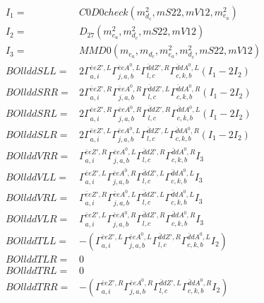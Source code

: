 \documentclass[A4,landscape]{article}
\begin{document}
\begin{align} 
I_1 = & C0D0check(m^2_{d_{{c}}}, mS22, mV12, m^2_{e_{{a}}}) \\ 
I_2 = & D_{27}(m^2_{e_{{a}}}, m^2_{d_{{c}}}, mS22, mV12) \\ 
I_3 = & MMD0(m_{e_{{a}}}, m_{d_{{c}}}, m^2_{e_{{a}}}, m^2_{d_{{c}}}, mS22, mV12) \\ 
  BOllddSLL= & 2  \Gamma^{\bar{e}e {Z'} ,L}_{a, i} \Gamma^{\bar{e}e A^0 ,L}_{j, a, b} \Gamma^{\bar{d}d {Z'} ,R}_{l, c} \Gamma^{\bar{d}d A^0 ,L}_{c, k, b} (I_1 - 2 I_2) \\ 
  BOllddSRR= & 2  \Gamma^{\bar{e}e {Z'} ,R}_{a, i} \Gamma^{\bar{e}e A^0 ,R}_{j, a, b} \Gamma^{\bar{d}d {Z'} ,L}_{l, c} \Gamma^{\bar{d}d A^0 ,R}_{c, k, b} (I_1 - 2 I_2) \\ 
  BOllddSRL= & 2  \Gamma^{\bar{e}e {Z'} ,R}_{a, i} \Gamma^{\bar{e}e A^0 ,R}_{j, a, b} \Gamma^{\bar{d}d {Z'} ,R}_{l, c} \Gamma^{\bar{d}d A^0 ,L}_{c, k, b} (I_1 - 2 I_2) \\ 
  BOllddSLR= & 2  \Gamma^{\bar{e}e {Z'} ,L}_{a, i} \Gamma^{\bar{e}e A^0 ,L}_{j, a, b} \Gamma^{\bar{d}d {Z'} ,L}_{l, c} \Gamma^{\bar{d}d A^0 ,R}_{c, k, b} (I_1 - 2 I_2) \\ 
  BOllddVRR= &  \Gamma^{\bar{e}e {Z'} ,R}_{a, i} \Gamma^{\bar{e}e A^0 ,L}_{j, a, b} \Gamma^{\bar{d}d {Z'} ,R}_{l, c} \Gamma^{\bar{d}d A^0 ,R}_{c, k, b} I_3 \\ 
  BOllddVLL= &  \Gamma^{\bar{e}e {Z'} ,L}_{a, i} \Gamma^{\bar{e}e A^0 ,R}_{j, a, b} \Gamma^{\bar{d}d {Z'} ,L}_{l, c} \Gamma^{\bar{d}d A^0 ,L}_{c, k, b} I_3 \\ 
  BOllddVRL= &  \Gamma^{\bar{e}e {Z'} ,R}_{a, i} \Gamma^{\bar{e}e A^0 ,L}_{j, a, b} \Gamma^{\bar{d}d {Z'} ,L}_{l, c} \Gamma^{\bar{d}d A^0 ,L}_{c, k, b} I_3 \\ 
  BOllddVLR= &  \Gamma^{\bar{e}e {Z'} ,L}_{a, i} \Gamma^{\bar{e}e A^0 ,R}_{j, a, b} \Gamma^{\bar{d}d {Z'} ,R}_{l, c} \Gamma^{\bar{d}d A^0 ,R}_{c, k, b} I_3 \\ 
  BOllddTLL= & -( \Gamma^{\bar{e}e {Z'} ,L}_{a, i} \Gamma^{\bar{e}e A^0 ,L}_{j, a, b} \Gamma^{\bar{d}d {Z'} ,R}_{l, c} \Gamma^{\bar{d}d A^0 ,L}_{c, k, b} I_2) \\ 
  BOllddTLR= & 0 \\ 
  BOllddTRL= & 0 \\ 
  BOllddTRR= & -( \Gamma^{\bar{e}e {Z'} ,R}_{a, i} \Gamma^{\bar{e}e A^0 ,R}_{j, a, b} \Gamma^{\bar{d}d {Z'} ,L}_{l, c} \Gamma^{\bar{d}d A^0 ,R}_{c, k, b} I_2) \\ 
\end{align} 
\end{document}
